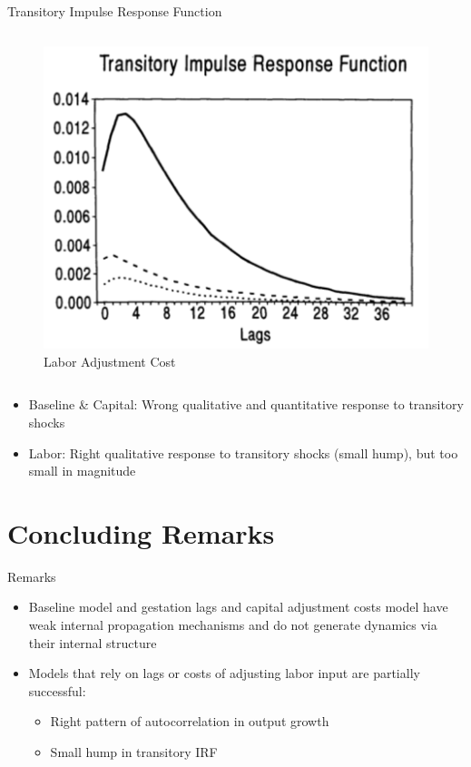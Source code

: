 \documentclass[10pt]{beamer}
\begin{document}
\begin{frame}{Transitory Impulse Response Function}
\begin{columns}[T,onlytextwidth]
        \begin{figure}
            \centering
            \includegraphics[width=\linewidth]{figures/L_trans_IRF.png}
            \caption{Labor Adjustment Cost}
        \end{figure}
    \end{columns}

    \begin{itemize}
        \item Baseline \& Capital: Wrong qualitative and quantitative response to transitory
              shocks
        \item Labor: Right qualitative response to transitory shocks (small hump), but too
              small in magnitude
    \end{itemize}

\end{frame}

\section{Concluding Remarks}

\begin{frame}{Remarks}
    \begin{itemize}
        \item Baseline model and gestation lags and capital adjustment costs model have weak
              internal propagation mechanisms and do not generate dynamics via their internal
              structure
        \item Models that rely on lags or costs of adjusting labor input are partially
              successful:
              \begin{itemize}
                  \item Right pattern of autocorrelation in output growth
                  \item Small hump in transitory IRF
              \end{itemize}
    \end{itemize}

\end{frame}
\end{document}

